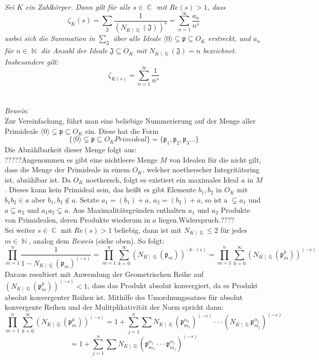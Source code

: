 \documentclass[10pt,a4paper]{article}
\DeclareMathOperator{\C}{\mathbb{C}}
\DeclareMathOperator{\Q}{\mathbb{Q}}
\DeclareMathOperator{\N}{\mathbb{N}}
\begin{document}
\textit{Sei $\textit{K}$ ein Zahlkörper. Dann gilt für alle $s \in \C$ mit $Re(s)>1$, dass$$\zeta_{K}(s) = \sum_{\mathfrak{J}}\frac{1}{(N_{K\mid\Q}(\mathfrak{J}))^s}=\sum_{n=1}^{\infty}\frac{a_n}{n^s}$$
wobei sich die Summation in $\sum_{\mathfrak{J}}$ über alle Ideale $\langle0\rangle\subsetneq \mathfrak{p} \subseteq O_{\textit{K}}$ erstreckt, und $a_n$ für $n \in \N$ die Anzahl der Ideale $\mathfrak{J} \subseteq O_K$ mit $N_{K\mid \Q}(\mathfrak{J}) = n$ bezeichnet. Insbesondere gilt: $$\zeta_{K(s)}= \sum_{n=1}^{\infty}\frac{1}{n^s}$$}
\\
\\
\textit{Beweis}:
\\
Zur Vereinfachung, führt man eine beliebige Nummerierung auf der Menge aller Primideale $\langle0\rangle\subsetneq \mathfrak{p} \subseteq O_{\textit{K}}$ ein. Diese hat die Form $$\{\langle0\rangle\subsetneq \mathfrak{p} \subseteq O_{\textit{K}} Primideal \}=\{\mathfrak{p}_1,\mathfrak{p}_2,\mathfrak{p}_3...\}$$Die Abzählbarkeit dieser Menge folgt aus: 
\\
?????Angenommen es gibt eine nichtleere Menge $M$ von Idealen für die nicht gilt, dass die Menge der Primideale in einem $O_K$, welcher noetherscher Integritätsring ist, abzählbar ist. Da $O_K$ noethersch, folgt es existiert ein maximales Ideal $a$ in $M$. Dieses kann kein Primideal sein, das heißt es gibt Elemente $b_1,b_2$ in $O_K$ mit $b_1b_2 \in a$ aber $b_1,b_2 \notin a$. Setzte $a_1=(b_1)+a$, $a_2=(b_2)+a$, so ist a $\subsetneq a_1$ und $a \subsetneq a_2$ und $a_1a_2 \subsetneq a$. Aus Maximalitätsgründen enthalten $a_1$ und $a_2$ Produkte von Primidealen, deren Produkte wiederum in $a$ liegen.Widerspruch.????
\\
Sei weiter $s \in \C$ mit $Re(s) > 1$ beliebig, dann ist mit $N_{K\mid \Q}\leq 2$ für jedes $m \in \N$, analog dem \textit{Beweis} (siehe oben). So folgt:$$\prod_{m=1}^{n}\frac{1}{1-N_{K\mid \Q}(\mathfrak{p}_m)^{(-s)}} =\prod_{m=1}^{n}\sum_{k=0}^{\infty}(N_{K\mid \Q}(\mathfrak{p}_m))^{-k\cdot(s)}=\prod_{m=1}^{n}\sum_{k=0}^{\infty}(N_{K\mid \Q}(\mathfrak{p}_m^k))^{(-s)}$$
Daraus resultiert mit Anwendung der Geometrischen Reihe auf \\
$(N_{K\mid \Q}(\mathfrak{p}_m^k))^{(-s)} < 1$, dass das Produkt absolut konvergiert, da es Produkt absolut konvergenter Reihen ist. Mithilfe des Umordnungssatzes für absolut konvergente Reihen und der Mulitplikativität der Norm spricht dann:
$$\prod_{m=1}^{n}\sum_{k=0}^{\infty}(N_{K\mid \Q}(\mathfrak{p}_m^k))^{(-s)}=1+\sum_{j=1}^{n}\sum N_{K\mid \Q}(\mathfrak{p}_{m_1}^{\alpha_1})^{(-s)}\cdot\cdot\cdot(N_{K\mid \Q}\mathfrak{p}_{m_j}^{\alpha_j})^{(-s)}$$ $$=1+\sum_{j=1}^{n}\sum N_{K\mid \Q}(\mathfrak{p}_{m_1}^{\alpha_1}\cdot\cdot\cdot\mathfrak{p}_{m_j}^{\alpha_j})^{(-s)}$$
\end{document}
